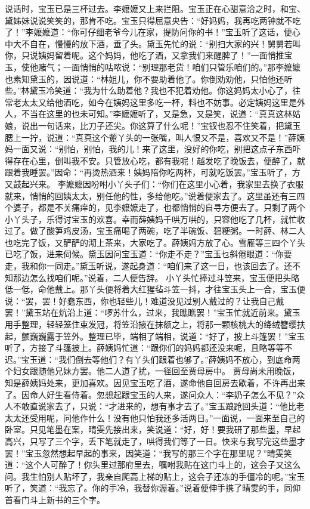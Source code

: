 \documentclass[12pt,oneside]{book}
\begin{document}
说话时，宝玉已是三杯过去。李嬷嬷又上来拦阻。宝玉正在心甜意洽之时，和宝、黛姊妹说说笑笑的，那肯不吃。宝玉只得屈意央告：“好妈妈，我再吃两钟就不吃了！”李嬷嬷道：“你可仔细老爷今儿在家，提防问你的书！”宝玉听了这话，便心中大不自在，慢慢的放下酒，垂了头。黛玉先忙的说：“别扫大家的兴！舅舅若叫你，只说姨妈留着呢。这个妈妈，他吃了酒，又拿我们来醒脾了！”一面悄推宝玉，使他赌气；一面悄悄的咕哝说：“别理那老货！咱们只管乐咱们的。”那李嬷嬷也素知黛玉的，因说道：“林姐儿，你不要助着他了。你倒劝劝他，只怕他还听些。”林黛玉冷笑道：“我为什么助着他？我也不犯着劝他。你这妈妈太小心了，往常老太太又给他酒吃，如今在姨妈这里多吃一杯，料也不妨事。必定姨妈这里是外人，不当在这里的也未可知。”李嬷嬷听了，又是急，又是笑，说道：“真真这林姑娘，说出一句话来，比刀子还尖。你这算了什么呢！”宝钗也忍不住笑着，把黛玉腮上一拧，说道：“真真这个颦丫头的一张嘴，叫人恨又不是，喜欢又不是！”薛姨妈一面又说：“别怕，别怕，我的儿！来了这里，没好的你吃，别把这点子东西吓得存在心里，倒叫我不安。只管放心吃，都有我呢！越发吃了晚饭去，便醉了，就跟着我睡罢。”因命：“再烫热酒来！姨妈陪你吃两杯，可就吃饭罢。”宝玉听了，方又鼓起兴来。
李嬷嬷因吩咐小丫头子们：“你们在这里小心着，我家里去换了衣服就来，悄悄的回姨太太，别任他的性，多给他吃。”说着便家去了。这里虽还有三四个婆子，都是不关痛痒的，见李嬷嬷走了，也都悄悄的自寻方便去了。只剩了两个小丫头子，乐得讨宝玉的欢喜。幸而薛姨妈千哄万哄的，只容他吃了几杯，就忙收过了。做了酸笋鸡皮汤，宝玉痛喝了两碗，吃了半碗饭、碧粳粥。一时薛、林二人也吃完了饭，又酽酽的沏上茶来，大家吃了。薛姨妈方放了心。雪雁等三四个丫头已吃了饭，进来伺候。黛玉因问宝玉道：“你走不走？”宝玉乜斜倦眼道：“你要走，我和你一同走。”黛玉听说，遂起身道：“咱们来了这一日，也该回去了。还不知那边怎么找咱们呢。”说着，二人便告辞。
小丫头忙捧过斗笠来，宝玉便把头略低一低，命他戴上。那丫头便将着大红猩毡斗笠一抖，才往宝玉头上一合，宝玉便说：“罢，罢！好蠢东西，你也轻些儿！难道没见过别人戴过的？让我自己戴罢！”黛玉站在炕沿上道：“啰苏什么，过来，我瞧瞧罢！”宝玉忙就近前来。黛玉用手整理，轻轻笼住束发冠，将笠沿掖在抹额之上，将那一颗核桃大的绛绒簪缨扶起，颤巍巍露于笠外。整理已毕，端相了端相，说道：“好了，披上斗篷罢！”宝玉听了，方接了斗篷披上。薛姨妈忙道：“跟你们的妈妈都还没来呢，且略等等不迟。”宝玉道：“我们倒去等他们？有丫头们跟着也够了。”薛姨妈不放心，到底命两个妇女跟随他兄妹方罢。他二人道了扰，一径回至贾母房中。
贾母尚未用晚饭，知是薛姨妈处来，更加喜欢。因见宝玉吃了酒，遂命他自回房去歇着，不许再出来了。因命人好生看侍着。忽想起跟宝玉的人来，遂问众人：“李奶子怎么不见？”众人不敢直说家去了，只说：“才进来的，想有事才去了。”宝玉踉跄回头道：“他比老太太还受用呢，问他作什么！没有他只怕我还多活两日。”一面说，一面来至自己的卧室。只见笔墨在案，晴雯先接出来，笑说道：“好，好！要我研了那些墨，早起高兴，只写了三个字，丢下笔就走了，哄得我们等了一日。快来与我写完这些墨才罢！”宝玉忽然想起早起的事来，因笑道：“我写的那三个字在那里呢？”晴雯笑道：“这个人可醉了！你头里过那府里去，嘱咐我贴在这门斗上的，这会子又这么问。我生怕别人贴坏了，我亲自爬高上梯的贴上，这会子还冻的手僵冷的呢。”宝玉听了，笑道：“我忘了。你的手冷，我替你渥着。”说着便伸手携了晴雯的手，同仰首看门斗上新书的三个字。
\end{document}
